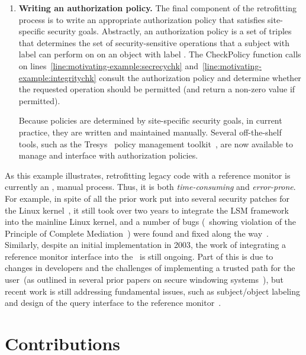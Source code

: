 \begin{enumerate}
\item \textbf{Writing an authorization policy.} The final component of the
retrofitting process is to write an appropriate authorization policy that
satisfies site-specific security goals. Abstractly, an authorization policy is
a set of triples
 that
determines the set of security-sensitive operations that a subject with label
 can perform on on an object with label
. The \textsf{CheckPolicy} function calls on
lines~\ref{line:motivating-example:secrecychk}
and~\ref{line:motivating-example:integritychk} consult the authorization policy
and determine whether the requested operation should be permitted (and return a
non-zero value if permitted). 

Because policies are determined by site-specific security goals, in current
practice, they are written and maintained manually. Several off-the-shelf
tools, such as the Tresys \selinux\ policy management
toolkit~\cite{tresys1,tresys2}, are now available to manage and interface with
authorization policies.

\end{enumerate}

As this example illustrates, retrofitting legacy code with a reference monitor
is currently an \adhoc, manual process. Thus, it is both
\textit{time-consuming} and \textit{error-prone}. For example, in spite of all
the prior work put into several security patches for the Linux
kernel~\cite{argus,grsecurity,rsbac,nsa,apparmor,lids}, it still took over two
years to integrate the LSM framework into the mainline Linux kernel, and a
number of bugs (\eg~showing violation of the Principle of Complete
Mediation~\cite{ss75}) were found and fixed along the way~\cite{jez04,zej02}.
Similarly, despite an initial implementation in 2003, the work of integrating a
reference monitor interface into the \xserver\ is still ongoing. Part of this
is due to changes in developers and the challenges of implementing a trusted
path for the user~(as outlined in several prior papers on secure windowing
systems~\cite{bpw+90,e90,emo+93,ep91,mpr06}), but recent work is still
addressing fundamental issues, such as subject/object labeling and design of
the query interface to the reference monitor~\cite{w07}.

              
\section{Contributions}
\label{chapter:introduction:contributions}

